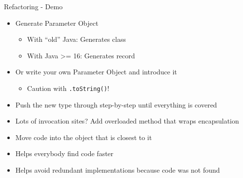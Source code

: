 \begin{frame}[fragile]{\de{}\en{}}

\begin{center}
{
\huge
Refactoring - Demo
}
\end{center}

\end{frame}

\begin{frame}[fragile]{\de{}}

\begin{itemize}
\item Generate Parameter Object
\begin{itemize}
\item With ``old'' Java: Generates class
\item With Java >= 16: Generates record
\end{itemize}
\item Or write your own Parameter Object and introduce it
\begin{itemize}
\item Caution with \texttt{.toString()}!
\end{itemize}
\item Push the new type through step-by-step until everything is covered
\item Lots of invocation sites? Add overloaded method that wraps encapsulation
\end{itemize}

\end{frame}


\begin{frame}[fragile]{\de{}}

\begin{itemize}
\item Move code into the object that is closest to it
\item Helps everybody find code faster
\item Helps avoid redundant implementations because code was not found
\end{itemize}

\end{frame}


